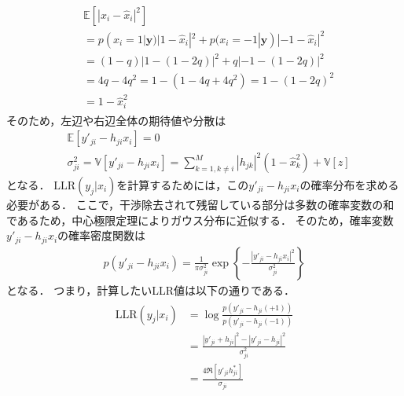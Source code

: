 \documentclass[twocolumn, a4paper]{ieicejsp}
\newcommand{\ABS}[1]{\left|#1\right|}
\newcommand{\Brkts}[1]{\left\{#1\right\}}
\newcommand{\BRKTS}[1]{\left[#1\right]}
\begin{document}
\begin{align}
  \begin{split}
    &\mathbb{E}[|x_i-\hat{x}_i|^2] \\
    &= p(x_i=1 | \mathbf{y}) |1-\hat{x}_i|^2 + p(x_i=-1 | \mathbf{y}) |-1-\hat{x}_i|^2 \\
    &= (1-q) |1 - (1-2q)|^2 + q |-1-(1-2q)|^2 \\
    &= 4q - 4q^2 = 1 - (1 - 4q + 4q^2) = 1 - (1 - 2q)^2 \\
    &= 1 - \hat{x}_i^2
  \end{split}
\end{align}
そのため，左辺や右辺全体の期待値や分散は
\begin{align}
  &\mathbb{E}[y'_{ji} - h_{ji} x_i] = 0 \\
  &\sigma_{ji}^2 = \mathbb{V}[y'_{ji} - h_{ji}x_i] = \sum_{k=1,k\not=i}^{M} |h_{jk}|^2 (1- \hat{x}_k^2) + \mathbb{V}[z]
\end{align}
となる．
$\mathrm{LLR}(y_j | x_i)$を計算するためには，この$y'_{ji} - h_{ji} x_i$の確率分布を求める必要がある．
ここで，干渉除去されて残留している部分は多数の確率変数の和であるため，中心極限定理によりガウス分布に近似する．
そのため，確率変数$y'_{ji} - h_{ji} x_i$の確率密度関数は
\begin{align}
  p(y'_{ji} - h_{ji} x_i) = \frac{1}{\pi \sigma_{ji}^2} \exp\Brkts{-\frac{\ABS{y'_{ji} - h_{ji} x_i}^2}{\sigma_{ji}^2}}
\end{align}
となる．
つまり，計算したいLLR値は以下の通りである．
\begin{align}
  \begin{split}
    \mathrm{LLR}(y_j | x_i) &= \log \frac{p(y'_{ji} - h_{ji} (+1))}{p(y'_{ji} - h_{ji} (-1))} \\
    &= \frac{\ABS{y'_{ji} + h_{ji}}^2 - \ABS{y'_{ji} - h_{ji}}^2}{\sigma_{ji}^2} \\
    &=  \frac{4\Re\BRKTS{y'_{ji} h_{ji}^{*} }}{\sigma_{ji}}
  \end{split}
\end{align}
\end{document}
